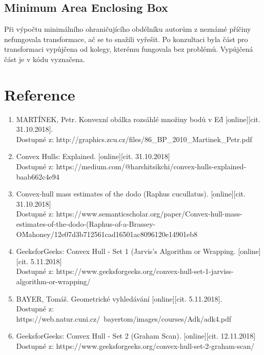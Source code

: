 \documentclass[a4paper, 12pt]{article}
\begin{document}
\subsection{Minimum Area Enclosing Box}
Při výpočtu minimálního ohraničujícího obdélníku autorům z neznámé příčiny nefungovala transformace, ač se to snažili vyřešit. Po konzultaci byla část pro transformaci vypůjčena od kolegy, kterému fungovala bez problémů. Vypůjčená část je v kódu vyznačena. 





\clearpage
\section{Reference}

\begin{enumerate}
\item  MARTÍNEK, Petr. Konvexní obálka rozsáhlé množiny bodů v E\^d [online][cit. 31.10.2018]. \\
Dostupné z: http://graphics.zcu.cz/files/86\_BP\_2010\_Martinek\_Petr.pdf  \\

\item Convex Hulls: Explained. [online][cit. 31.10.2018]\\
Dostupné z: https://medium.com/@harshitsikchi/convex-hulls-explained-baab662c4e94\\

\item Convex-hull mass estimates of the dodo (Raphus cucullatus). [online][cit. 31.10.2018]\\
Dostupné z: https://www.semanticscholar.org/paper/Convex-hull-mass-estimates-of-the-dodo-(Raphus-of-a-Brassey-O\'Mahoney/12e07d3b712561cad16501ac8096120e14901eb8

\item GeeksforGeeks: Convex Hull - Set 1 (Jarvis's Algorithm or Wrapping. [online][cit. 5.11.2018]\\
Dostupné z: https://www.geeksforgeeks.org/convex-hull-set-1-jarviss-algorithm-or-wrapping/

\item  BAYER, Tomáš. Geometrické vyhledávání [online][cit. 5.11.2018]. \\
Dostupné z: https://web.natur.cuni.cz/~bayertom/images/courses/Adk/adk4.pdf  \\

\item GeeksforGeeks: Convex Hull - Set 2 (Graham Scan). [online][cit. 12.11.2018]\\
Dostupné z: https://www.geeksforgeeks.org/convex-hull-set-2-graham-scan/



\end{enumerate}
\end{document}
